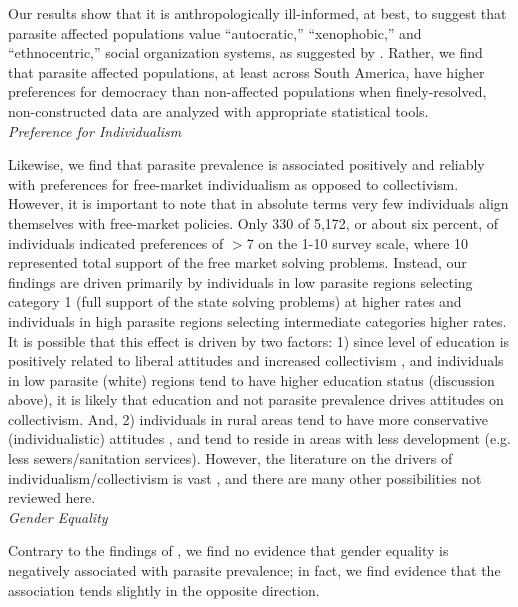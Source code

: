 \documentclass[12pt]{article}
\begin{document}
	Our results show that it is anthropologically ill-informed, at best, to suggest that parasite affected populations value ``autocratic,'' ``xenophobic,'' and ``ethnocentric,'' social organization systems, as suggested by \citet{Thornhill2009}. Rather, we find that parasite affected populations, at least across South America, have higher preferences for democracy than non-affected populations when finely-resolved, non-constructed data are analyzed with appropriate statistical tools.\\
	
	
\noindent\textit{Preference for Individualism}

	Likewise, we find that parasite prevalence is associated positively and reliably with preferences for free-market individualism as opposed to collectivism. However, it is important to note that in absolute terms very few individuals align themselves with free-market policies.  Only 330 of 5,172, or about six percent, of individuals indicated preferences of $>$7 on the 1-10 survey scale, where 10 represented total support of the free market solving problems.  Instead, our findings are driven primarily  by individuals in low parasite regions selecting category 1 (full support of the state solving problems) at higher rates and individuals in high parasite regions selecting intermediate categories higher rates.  It is possible that this effect is driven by two factors: 1) since level of education is positively related to liberal attitudes and increased collectivism \citep{schoon2010social}, and individuals in low parasite (white) regions tend to have higher education status (discussion above), it is likely that education and not parasite prevalence drives attitudes on collectivism. And, 2) individuals in rural areas tend to have more conservative (individualistic) attitudes \citep{fennelly2008rural,ellison2011religion}, and tend to reside in areas with less development (e.g. less sewers/sanitation services). However, the literature on the drivers of individualism/collectivism is vast \citep{triandis2001individualism}, and there are many other possibilities not reviewed here.   \\

\noindent\textit{Gender Equality}

	Contrary to the findings of \citet{Thornhill2009}, we find no evidence that gender equality is negatively associated with parasite prevalence; in fact, we find evidence that the association tends slightly in the opposite direction. \\[12pt] 
 
\end{document}
